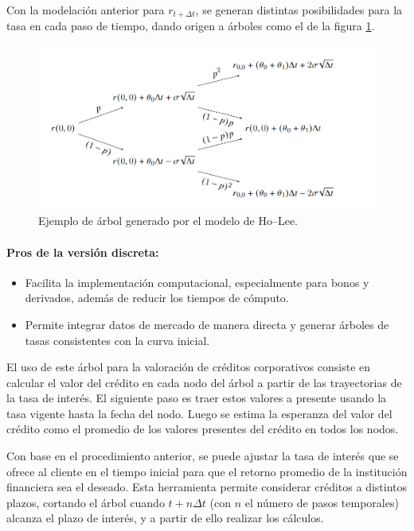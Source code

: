 \qquad Con la modelación anterior para $r_{t+\Delta t}$, se generan distintas posibilidades para la tasa en cada paso de tiempo, dando origen a árboles como el de la figura \ref{fig:arbolHL}.

\begin{figure}[h]
    \centering
    \includegraphics[scale=0.5]{images/grafico_Ho_Lee.png}
    \caption{Ejemplo de árbol generado por el modelo de Ho--Lee.}
    \label{fig:arbolHL}
\end{figure}
\paragraph{Pros de la versión discreta:}
\begin{itemize}
    \item Facilita la implementación computacional, especialmente para bonos y derivados, además de reducir los tiempos de cómputo.
    \item Permite integrar datos de mercado de manera directa y generar árboles de tasas consistentes con la curva inicial.
\end{itemize}

\qquad El uso de este árbol para la valoración de créditos corporativos consiste en calcular el valor del crédito en cada nodo del árbol a partir de las trayectorias de la tasa de interés. El siguiente paso es traer estos valores a presente usando la tasa vigente hasta la fecha del nodo. Luego se estima la esperanza del valor del crédito como el promedio de los valores presentes del crédito en todos los nodos.

\qquad Con base en el procedimiento anterior, se puede ajustar la tasa de interés que se ofrece al cliente en el tiempo inicial para que el retorno promedio de la institución financiera sea el deseado. Esta herramienta permite considerar créditos a distintos plazos, cortando el árbol cuando $t+n\Delta t$ (con $n$ el número de pasos temporales) alcanza el plazo de interés, y a partir de ello realizar los cálculos.
